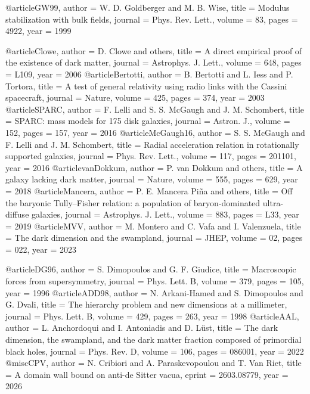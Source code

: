 @article{GW99, author = {W. D. Goldberger and M. B. Wise}, title = {Modulus stabilization with bulk fields}, journal = {Phys. Rev. Lett.}, volume = {83}, pages = {4922}, year = {1999}}

@article{Clowe, author = {D. Clowe and others}, title = {A direct empirical proof of the existence of dark matter}, journal = {Astrophys. J. Lett.}, volume = {648}, pages = {L109}, year = {2006}}
@article{Bertotti, author = {B. Bertotti and L. Iess and P. Tortora}, title = {A test of general relativity using radio links with the Cassini spacecraft}, journal = {Nature}, volume = {425}, pages = {374}, year = {2003}}
@article{SPARC, author = {F. Lelli and S. S. McGaugh and J. M. Schombert}, title = {SPARC: mass models for 175 disk galaxies}, journal = {Astron. J.}, volume = {152}, pages = {157}, year = {2016}}
@article{McGaugh16, author = {S. S. McGaugh and F. Lelli and J. M. Schombert}, title = {Radial acceleration relation in rotationally supported galaxies}, journal = {Phys. Rev. Lett.}, volume = {117}, pages = {201101}, year = {2016}}
@article{vanDokkum, author = {P. van Dokkum and others}, title = {A galaxy lacking dark matter}, journal = {Nature}, volume = {555}, pages = {629}, year = {2018}}
@article{Mancera, author = {P. E. Mancera Pi\~na and others}, title = {Off the baryonic Tully--Fisher relation: a population of baryon-dominated ultra-diffuse galaxies}, journal = {Astrophys. J. Lett.}, volume = {883}, pages = {L33}, year = {2019}}
@article{MVV, author = {M. Montero and C. Vafa and I. Valenzuela}, title = {The dark dimension and the swampland}, journal = {JHEP}, volume = {02}, pages = {022}, year = {2023}}

@article{DG96, author = {S. Dimopoulos and G. F. Giudice}, title = {Macroscopic forces from supersymmetry}, journal = {Phys. Lett. B}, volume = {379}, pages = {105}, year = {1996}}
@article{ADD98, author = {N. Arkani-Hamed and S. Dimopoulos and G. Dvali}, title = {The hierarchy problem and new dimensions at a millimeter}, journal = {Phys. Lett. B}, volume = {429}, pages = {263}, year = {1998}}
@article{AAL, author = {L. Anchordoqui and I. Antoniadis and D. L\"ust}, title = {The dark dimension, the swampland, and the dark matter fraction composed of primordial black holes}, journal = {Phys. Rev. D}, volume = {106}, pages = {086001}, year = {2022}}
@misc{CPV, author = {N. Cribiori and A. Paraskevopoulou and T. Van Riet}, title = {A domain wall bound on anti-de Sitter vacua}, eprint = {2603.08779}, year = {2026}}

